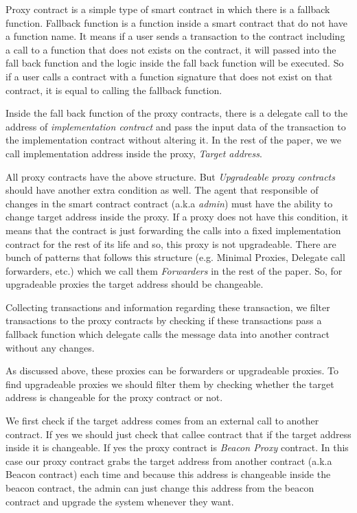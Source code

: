 Proxy contract is a simple type of smart contract in which there is a fallback function. Fallback function is a function inside a smart contract that do not have a function name. It means if a user sends a transaction to the contract including a call to a function that does not exists on the contract, it will passed into the fall back function and the logic inside the fall back function will be executed. So if a user calls a contract with a function signature that does not exist on that contract, it is equal to calling the fallback function.

Inside the fall back function of the proxy contracts, there is a delegate call to the address of \textit{implementation contract} and pass the input data of the transaction to the implementation contract without altering it. In the rest of the paper, we we call implementation address inside the proxy, \emph{Target address}.

All proxy contracts have the above structure. But \textit{Upgradeable proxy contracts} should have another extra condition as well. The agent that responsible of changes in the smart contract contract (a.k.a \emph{admin}) must have the ability to change target address inside the proxy. If a proxy does not have this condition, it means that the contract is just forwarding the calls into a fixed implementation contract for the rest of its life and so, this proxy is not upgradeable. There are bunch of patterns that follows this structure (e.g. Minimal Proxies, Delegate call forwarders, etc.) which we call them \textit{Forwarders} in the rest of the paper. So, for upgradeable proxies the target address should be changeable.

Collecting transactions and information regarding these transaction, we filter transactions to the proxy contracts by checking if these transactions pass a fallback function which delegate calls the message data into another contract without any changes.

As discussed above, these proxies can be forwarders or upgradeable proxies. To find upgradeable proxies we should filter them by checking whether the target address is changeable for the proxy contract or not.

We first check if the target address comes from an external call to another contract. If yes we should just check that callee contract that if the target address inside it is changeable. If yes the proxy contract is \textit{Beacon Proxy} contract. In this case our proxy contract grabs the target address from another contract (a.k.a Beacon contract) each time and because this address is changeable inside the beacon contract, the admin can just change this address from the beacon contract and upgrade the system whenever they want.

